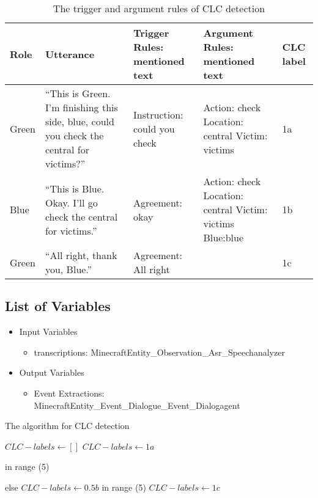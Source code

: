 \begin{table*}[tb]
\centering
\begin{tabular}{lp{1in}lll}
    \toprule
    Role & Utterance & Trigger Rules: mentioned text & Argument Rules: mentioned text & CLC label \\\midrule
   Green & “This is Green. I’m finishing this side, blue, could you check the central for victims?” & Instruction: could you check & Action: check \newline Location: central \newline Victim: victims & 1a\\
   Blue & “This is Blue. Okay. I’ll go check the central for victims.” & Agreement: okay & Action: check \newline Location: central \newline Victim: victims \newline Blue:blue & 1b\\
   Green & “All right, thank you, Blue.” & Agreement: All right &  & 1c\\
    \bottomrule
\end{tabular}
\caption{The trigger and argument rules of CLC detection}
\label{tab:clc-triggers-labels}
\end{table*}
\subsection{List of Variables}
\begin{itemize}
    \item Input Variables
    \begin{itemize}
        \item transcriptions: MinecraftEntity\_Observation\_Asr\_Speechanalyzer
    \end{itemize}
    \item Output Variables
    \begin{itemize}
        \item Event Extractions: MinecraftEntity\_Event\_Dialogue\_Event\_Dialogagent
    \end{itemize}
\end{itemize}

\begin{algorithm}
\caption{The algorithm for CLC detection}\label{alg:CLC}
\begin{algorithmic}[1]
\State $CLC-labels \gets []$
     \State $CLC-labels \gets 1a$
     \EndIf
     \EndFunction

 in range (5)

     else
    \State $CLC-labels \gets 0.5b$
    \EndIf
    \EndFunction
{} in range (5)
     \State $CLC-labels \gets 1c$
     \EndIf
     \EndFunction
\end{algorithmic}
\end{algorithm}

